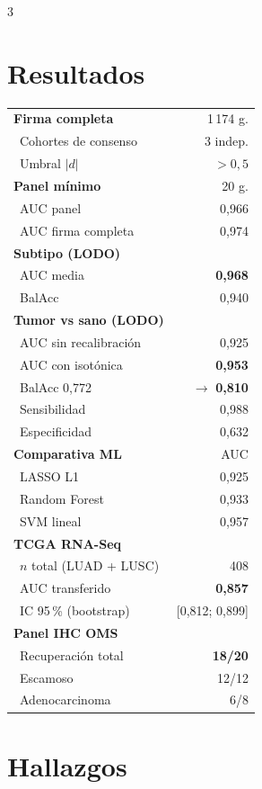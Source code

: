 \documentclass[10pt, a4paper, landscape]{article}
\begin{document}
\begin{multicols}{3}
\columnbreak

\section{Resultados}
\scriptsize
\begin{tabular}{@{}p{2.7cm}r@{}}
\toprule
\textbf{Firma completa} & 1\,174 g. \\
\ Cohortes de consenso & 3 indep. \\
\ Umbral $|d|$ & $>0{,}5$ \\
\midrule
\textbf{Panel m\'inimo} & 20 g. \\
\ AUC panel & 0,966 \\
\ AUC firma completa & 0,974 \\
\midrule
\textbf{Subtipo (LODO)} &  \\
\ AUC media & \textbf{0,968} \\
\ BalAcc & 0,940 \\
\midrule
\textbf{Tumor vs sano (LODO)} &  \\
\ AUC sin recalibraci\'on & 0,925 \\
\ AUC con isot\'onica & \textbf{0,953} \\
\ BalAcc 0,772 & $\to$ \textbf{0,810} \\
\ Sensibilidad & 0,988 \\
\ Especificidad & 0,632 \\
\midrule
\textbf{Comparativa ML} & AUC \\
\ LASSO L1 & 0,925 \\
\ Random Forest & 0,933 \\
\ SVM lineal & 0,957 \\
\midrule
\textbf{TCGA RNA-Seq} & \\
\ $n$ total (LUAD + LUSC) & 408 \\
\ AUC transferido & \textbf{0,857} \\
\ IC 95\,\% (bootstrap) & [0,812; 0,899] \\
\midrule
\textbf{Panel IHC OMS} & \\
\ Recuperaci\'on total & \textbf{18/20} \\
\ Escamoso & 12/12 \\
\ Adenocarcinoma & 6/8 \\
\bottomrule
\end{tabular}

\columnbreak

\section{Hallazgos}


\end{multicols}
\end{document}
